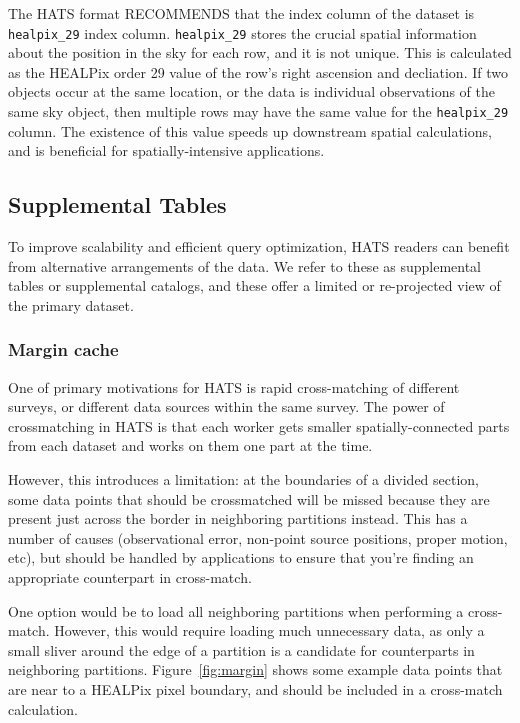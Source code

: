 \documentclass[11pt,a4paper]{ivoa}
\begin{document}
The HATS format RECOMMENDS that the index column of the dataset is \texttt{healpix\_29} index column.  
\texttt{healpix\_29} stores the crucial spatial information about the position in the sky for each row, and it is not unique.
This is calculated as the HEALPix order 29 value of the row's right ascension and decliation. 
If two objects occur at the same location, or the data is individual observations of the same sky object, then multiple rows may have the same value for the \texttt{healpix\_29} column.
The existence of this value speeds up downstream spatial calculations, and is beneficial for spatially-intensive applications.

\subsection{Supplemental Tables} \label{sec:supplemental}

To improve scalability and efficient query optimization, HATS readers can benefit from alternative arrangements of the data. 
We refer to these as supplemental tables or supplemental catalogs, and these offer a limited or re-projected view of the primary dataset.

\subsubsection{Margin cache} \label{sec:margin}

One of primary motivations for HATS is rapid cross-matching of different surveys, or different data sources within the same survey. 
The power of crossmatching in HATS is that each worker gets smaller spatially-connected parts from each dataset and works on them one part at the time. \par 

However, this introduces a limitation: at the boundaries of a divided section, some data points that should be crossmatched will be missed because they are present just across the border in neighboring partitions instead.
This has a number of causes (observational error, non-point source positions, proper motion, etc), but should be handled by applications to ensure that you're finding an appropriate counterpart in cross-match.\par

One option would be to load all neighboring partitions when performing a cross-match. 
However, this would require loading much unnecessary data, as only a small sliver around the edge of a partition is a candidate for counterparts in neighboring partitions. 
Figure~\ref{fig:margin} shows some example data points that are near to a HEALPix pixel boundary, and should be included in a cross-match calculation.
\end{document}
